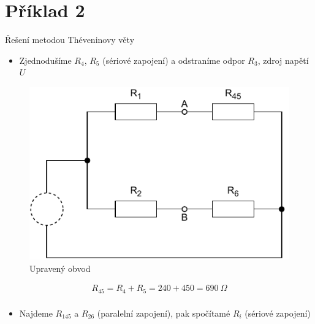 \section{Příklad 2}

\begin{center}
    \begin{LARGE}
        Řešení metodou Théveninovy věty
    \end{LARGE}
\end{center}
\setcounter{figure}{0}

\begin{itemize}
    \item Zjednodušíme $R_4$, $R_5$ (sériové zapojení) a odstraníme odpor $R_3$, zdroj napětí $U$
\end{itemize}

\begin{figure}[h]
    \centering
    \includegraphics[scale=0.8,keepaspectratio]{fig/Pr2_krok1.pdf}
    \caption{Upravený obvod}
    \label{pic:Pr2_krok1}
\end{figure}

\begin{center}
    \begin{gather*}
        R_{45} = R_4 + R_5 = 240 + 450 = 690 \: \Omega \\
    \end{gather*}
\end{center}

\newpage

\begin{itemize}
    \item Najdeme $R_{145}$ a $R_{26}$ (paralelní zapojení), pak spočítamé $R_i$ (sériové zapojení)
\end{itemize}

